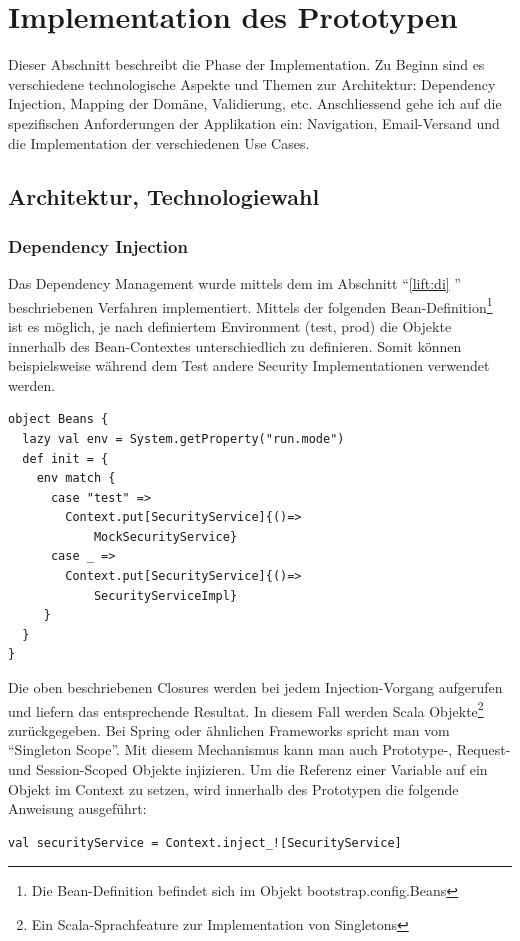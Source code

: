\chapter{Implementation des Prototypen}\label{implementation}
Dieser Abschnitt beschreibt die Phase der Implementation. Zu Beginn sind es verschiedene technologische Aspekte und Themen zur Architektur:  Dependency Injection, Mapping der Dom\"ane, Validierung, etc. Anschliessend gehe ich auf die spezifischen Anforderungen der Applikation ein: Navigation, Email-Versand und die Implementation der verschiedenen Use Cases. 

\section{Architektur, Technologiewahl}
\subsection{Dependency Injection}\label{implementation:di}
Das Dependency Management wurde mittels dem im Abschnitt ``\ref{lift:di} '' beschriebenen Verfahren implementiert. Mittels der folgenden Bean-Definition\footnote{Die Bean-Definition befindet sich im Objekt bootstrap.config.Beans } ist es m\"oglich, je nach definiertem Environment (test, prod) die Objekte innerhalb des Bean-Contextes unterschiedlich zu definieren. Somit k\"onnen beispielsweise w\"ahrend dem Test andere Security Implementationen verwendet werden.
\begin{lstlisting}[caption=Umgebungsabh\"angigkeit]
object Beans {
  lazy val env = System.getProperty("run.mode")
  def init = {
    env match {
      case "test" =>
        Context.put[SecurityService]{()=>
            MockSecurityService}
      case _ =>
        Context.put[SecurityService]{()=>
            SecurityServiceImpl}
     }
  }
}
\end{lstlisting}
Die oben beschriebenen Closures werden bei jedem Injection-Vorgang aufgerufen und liefern das entsprechende Resultat. In diesem Fall werden Scala Objekte\footnote{Ein Scala-Sprachfeature zur Implementation von Singletons} zur\"uckgegeben. Bei Spring oder \"ahnlichen Frameworks spricht man vom ``Singleton Scope''. Mit diesem Mechanismus kann man auch Prototype-, Request- und Session-Scoped Objekte injizieren. Um die Referenz einer Variable auf ein Objekt im Context zu setzen, wird innerhalb des Prototypen die folgende Anweisung ausgef\"uhrt: 
\begin{lstlisting}[caption=Anfrage einer Variable aus dem Lift Bean Context]
val securityService = Context.inject_![SecurityService]
\end{lstlisting}


